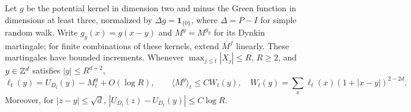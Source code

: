 \begin{lemma}\label{lem:core-green}
Let $g$ be the potential kernel in dimension two and minus the Green
function in dimensions at least three, normalized by
$\Delta g=\mathbf1_{\{0\}}$, where $\Delta=P-I$ for simple random walk.
Write $g_y(x)=g(x-y)$ and $M^y=M^{g_y}$ for its Dynkin martingale;
for finite combinations of these kernels, extend $M^f$ linearly.
These martingales have bounded increments. Whenever
$\max_{j\leq t}|X_j|\leq R$, $R\geq2$, and $y\in\mathbb Z^d$ satisfies $|y|\leq R^{d+2}$,
\begin{equation}\label{eq:core-green}
 \ell_t(y)=U_{D_t}(y)-M_t^y+O(\log R),\qquad
 \langle M^y\rangle_t\leq C W_t(y),\quad
 W_t(y)=\sum_x\ell_t(x)(1+|x-y|)^{2-2d}.
\end{equation}
Moreover, for $|z-y|\leq\sqrt d$,
$|U_{D_t}(z)-U_{D_t}(y)|\leq C\log R$.
\end{lemma}
